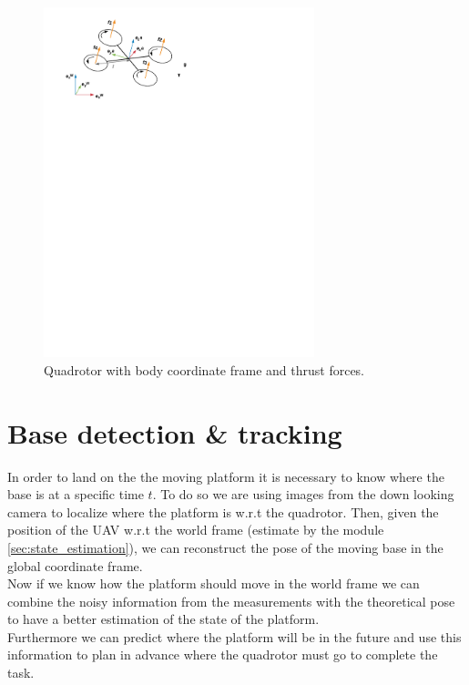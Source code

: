 \begin{figure}[!ht]
    \centering
    \includegraphics[width=0.7\textwidth]{img/quadrotor.pdf}
    \caption{Quadrotor with body coordinate frame and thrust forces.}
    \label{fig:bodyframe}
\end{figure}

\section{Base detection \& tracking}\label{sec:base_estimation}
In order to land on the the moving platform it is necessary to know where the base is at a specific time $t$. To do so we are using images from the down looking camera to localize where the platform is w.r.t the quadrotor. Then, given the position of the UAV w.r.t the world frame (estimate by the module \ref{sec:state_estimation}), we can reconstruct the pose of the moving base in the global coordinate frame. \\
Now if we know how the platform should move in the world frame we can combine the noisy information from the measurements with the theoretical pose to have a better estimation of the state of the platform.  \\
Furthermore we can predict where the platform will be in the future and use this information to plan in advance where the quadrotor must go to complete the task.\\

